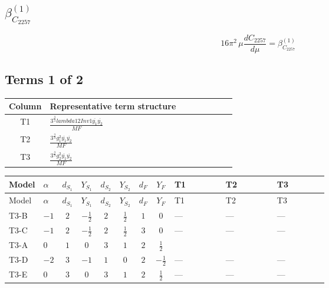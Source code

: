 \documentclass[8pt]{article}
\begin{document}
\begin{landscape}
\section*{$\beta_{C_{2257}}^{(1)}$}
\[16\pi^2\,\mu\frac{d C_{2257}}{d\mu}=\beta_{C_{2257}}^{(1)}\]
\subsection*{Terms 1 of 2}
\begin{center}
\begin{tabular}{@{}c >{\raggedright\arraybackslash}p{0.82\linewidth}@{}}
\toprule
Column & Representative term structure \\
\midrule
T1 & \(\displaystyle \frac{3^{\frac{3}{4}} lambda12Inv1 \overline{y_{1}} \overline{y_{2}}}{MF}\) \\
\midrule
T2 & \(\displaystyle \frac{3^{\frac{3}{4}} g_{1}^{2} \overline{y_{1}} \overline{y_{2}}}{MF}\) \\
\midrule
T3 & \(\displaystyle \frac{3^{\frac{3}{4}} g_{2}^{2} \overline{y_{1}} \overline{y_{2}}}{MF}\) \\
\midrule
\bottomrule
\end{tabular}
\end{center}
\smallskip
\tiny
\begin{longtable}{@{}llcccccc >{\raggedright\arraybackslash}p{0.21\linewidth} >{\raggedright\arraybackslash}p{0.21\linewidth} >{\raggedright\arraybackslash}p{0.21\linewidth}@{}}
\toprule
Model & $\alpha$ & $d_{S_1}$ & $Y_{S_1}$ & $d_{S_2}$ & $Y_{S_2}$ & $d_F$ & $Y_F$ & T1 & T2 & T3 \\
\midrule
\endfirsthead
\toprule
Model & $\alpha$ & $d_{S_1}$ & $Y_{S_1}$ & $d_{S_2}$ & $Y_{S_2}$ & $d_F$ & $Y_F$ & T1 & T2 & T3 \\
\midrule
\endhead
T3-B & $-1$ & $2$ & $-\frac{1}{2}$ & $2$ & $\frac{1}{2}$ & $1$ & $0$ & --- & --- & --- \\
\midrule
T3-C & $-1$ & $2$ & $-\frac{1}{2}$ & $2$ & $\frac{1}{2}$ & $3$ & $0$ & --- & --- & --- \\
\midrule
T3-A & $0$ & $1$ & $0$ & $3$ & $1$ & $2$ & $\frac{1}{2}$ & \scriptsize\adjustbox{max width=\linewidth}{$\begin{gathered} \frac{3^{\frac{3}{4}} lambda12Inv1 \overline{y_{1}} \overline{y_{2}}}{6 MF}\end{gathered}$} & \scriptsize\adjustbox{max width=\linewidth}{$\begin{gathered} \frac{3^{\frac{3}{4}} g_{1}^{2} \overline{y_{1}} \overline{y_{2}}}{8 MF}\end{gathered}$} & \scriptsize\adjustbox{max width=\linewidth}{$\begin{gathered} \frac{17 \cdot 3^{\frac{3}{4}} g_{2}^{2} \overline{y_{1}} \overline{y_{2}}}{24 MF}\end{gathered}$} \\
\midrule
T3-D & $-2$ & $3$ & $-1$ & $1$ & $0$ & $2$ & $-\frac{1}{2}$ & --- & --- & --- \\
\midrule
T3-E & $0$ & $3$ & $0$ & $3$ & $1$ & $2$ & $\frac{1}{2}$ & --- & --- & --- \\
\midrule
\bottomrule
\end{longtable}
\clearpage

\end{landscape}
\end{document}
